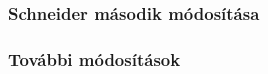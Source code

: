 
\subsubsection{Schneider második módosítása}
\label{subsubsec:bdssch2}

\subsubsection{További módosítások}
\label{subsubsec:bdstovabbi}
